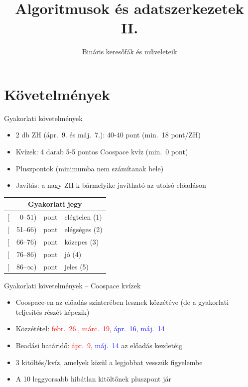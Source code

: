 \documentclass{beamer}
\institute{Szegedi Tudományegyetem}
\title{Algoritmusok és adatszerkezetek II.}
\subtitle{Bináris keresőfák és műveleteik}
\date{}
\begin{document}
\maketitle

\section{Követelmények}

\begin{frame}{Gyakorlati követelmények}
	\begin{itemize}
		\item 2 db ZH (ápr.~9. és máj.~7.): 40-40 pont (min.~18 pont/ZH)
		\item Kvízek: 4 darab 5-5 pontos Coospace kvíz (min.~0 pont)
		\item Pluszpontok (minimumba nem számítanak bele)
		\item Javítás: a nagy ZH-k bármelyike javítható az utolsó előadáson
	\end{itemize}
	\pause
	\begin{table}
	\centering
	\begin{tabular}{r@{}r@{ }l|l}
		\multicolumn{4}{c}{Gyakorlati jegy} \\ \hline
		{[}&0--51)  & pont & elégtelen (1) \\
		{[}&51--66) & pont & elégséges (2) \\
		{[}&66--76) & pont & közepes (3) \\
		{[}&76--86) & pont & jó (4) \\
		{[}&86--$\infty$) & pont & jeles (5)
	\end{tabular}
    \end{table}
\end{frame}

\begin{frame}{Gyakorlati követelmények -- Coospace kvízek}
	\begin{itemize}
		\item Coospace-en az előadás színterében lesznek közzétéve (de a gyakorlati teljesítés részét képezik)
		\item Közzététel: \textcolor{red}{febr.~26., márc.~19}, \textcolor{blue}{ápr.~16, máj.~14}
		\item Beadási határidő: \textcolor{red}{ápr.~9}, \textcolor{blue}{máj.~14} az előadás kezdetéig
		\item 3 kitöltés/kvíz, amelyek közül a legjobbat vesszük figyelembe
		\pause
		\item A 10 leggyorsabb hibátlan kitöltőnek pluszpont jár
	\end{itemize}
\end{frame}
\end{document}
